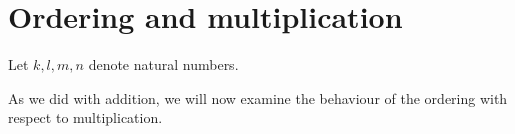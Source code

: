 \documentclass[../../arithmetic.ftl.tex]{subfiles}
\begin{document}
  \begin{comment}
    \begin{forthel}

    \end{forthel}
  \end{comment}


  \section{Ordering and multiplication}

  \begin{forthel}
  \end{forthel}

  \begin{forthel}
  \end{forthel}

  \begin{forthel}
    Let $k, l, m, n$ denote natural numbers.
  \end{forthel}

  As we did with addition, we will now examine the behaviour of the ordering
  with respect to multiplication.
\end{document}
